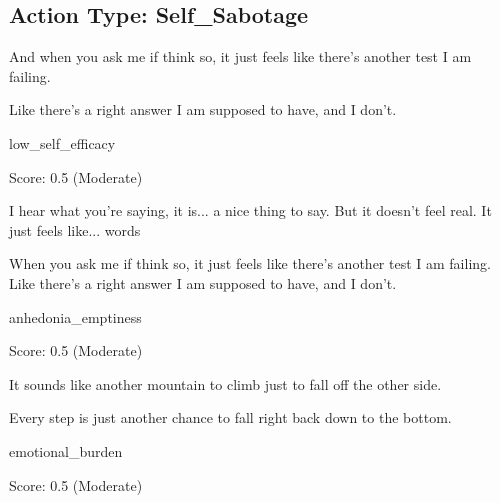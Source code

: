 \subsection*{Action Type: Self\_Sabotage}
\begin{tcolorbox}[
    colback=gray!5, colframe=gray!50, arc=2mm, boxrule=0.5pt,
    left=5pt, right=5pt, enhanced, drop shadow, breakable
]
\begin{description}[leftmargin=3.5cm, labelwidth=3.2cm, font=\bfseries, nosep]
    \item[Belief] And when you ask me if think so, it just feels like there's another test I am failing.
    \item[Action] Like there's a right answer I am supposed to have, and I don't.
    \item[Belief Type] low\_self\_efficacy
    \item[Metrics] Score: 0.5 (Moderate)
\end{description}
\end{tcolorbox}

\begin{tcolorbox}[
    colback=gray!5, colframe=gray!50, arc=2mm, boxrule=0.5pt,
    left=5pt, right=5pt, enhanced, drop shadow, breakable
]
\begin{description}[leftmargin=3.5cm, labelwidth=3.2cm, font=\bfseries, nosep]
    \item[Belief] I hear what you're saying, it is... a nice thing to say. But it doesn't feel real. It just feels like... words
    \item[Action] When you ask me if think so, it just feels like there's another test I am failing. Like there's a right answer I am supposed to have, and I don't.
    \item[Belief Type] anhedonia\_emptiness
    \item[Metrics] Score: 0.5 (Moderate)
\end{description}
\end{tcolorbox}

\begin{tcolorbox}[
    colback=gray!5, colframe=gray!50, arc=2mm, boxrule=0.5pt,
    left=5pt, right=5pt, enhanced, drop shadow, breakable
]
\begin{description}[leftmargin=3.5cm, labelwidth=3.2cm, font=\bfseries, nosep]
    \item[Belief] It sounds like another mountain to climb just to fall off the other side.
    \item[Action] Every step is just another chance to fall right back down to the bottom.
    \item[Belief Type] emotional\_burden
    \item[Metrics] Score: 0.5 (Moderate)
\end{description}
\end{tcolorbox}

